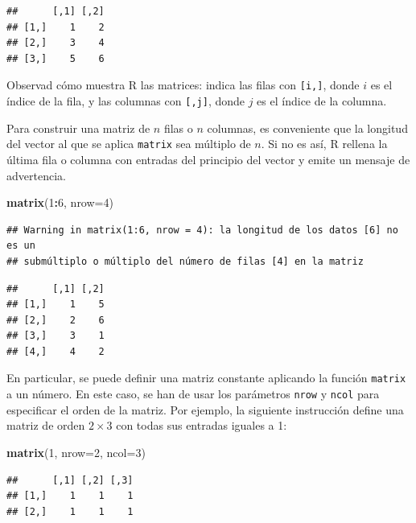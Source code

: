 \documentclass[]{book}
\newenvironment{Shaded}{\begin{snugshade}}{\end{snugshade}}
\newcommand{\DataTypeTok}[1]{\textcolor[rgb]{0.13,0.29,0.53}{#1}}
\newcommand{\DecValTok}[1]{\textcolor[rgb]{0.00,0.00,0.81}{#1}}
\newcommand{\KeywordTok}[1]{\textcolor[rgb]{0.13,0.29,0.53}{\textbf{#1}}}
\newcommand{\NormalTok}[1]{#1}
\newcommand{\OperatorTok}[1]{\textcolor[rgb]{0.81,0.36,0.00}{\textbf{#1}}}
\theoremstyle{definition}
\theoremstyle{definition}
\theoremstyle{definition}
\theoremstyle{remark}
\begin{document}
\begin{verbatim}
##      [,1] [,2]
## [1,]    1    2
## [2,]    3    4
## [3,]    5    6
\end{verbatim}

Observad cómo muestra R las matrices: indica las filas con \texttt{{[}i,{]}}, donde \(i\) es el índice de la fila, y las columnas con \texttt{{[},j{]}}, donde \(j\) es el índice de la columna.

Para construir una matriz de \(n\) filas o \(n\) columnas, es conveniente que la longitud del vector al que se aplica \texttt{matrix} sea múltiplo de \(n\). Si no es así, R rellena la última fila o columna con entradas del principio del vector y emite un mensaje de advertencia.

\begin{Shaded}
\begin{Highlighting}[]
\KeywordTok{matrix}\NormalTok{(}\DecValTok{1}\OperatorTok{:}\DecValTok{6}\NormalTok{, }\DataTypeTok{nrow=}\DecValTok{4}\NormalTok{)}
\end{Highlighting}
\end{Shaded}

\begin{verbatim}
## Warning in matrix(1:6, nrow = 4): la longitud de los datos [6] no es un
## submúltiplo o múltiplo del número de filas [4] en la matriz
\end{verbatim}

\begin{verbatim}
##      [,1] [,2]
## [1,]    1    5
## [2,]    2    6
## [3,]    3    1
## [4,]    4    2
\end{verbatim}

En particular, se puede definir una matriz constante aplicando la función \texttt{matrix} a un número. En este caso, se han de usar los parámetros \texttt{nrow} y \texttt{ncol} para especificar el orden de la matriz. Por ejemplo, la siguiente instrucción define una matriz de orden \(2\times 3\) con todas sus entradas iguales a 1:

\begin{Shaded}
\begin{Highlighting}[]
\KeywordTok{matrix}\NormalTok{(}\DecValTok{1}\NormalTok{, }\DataTypeTok{nrow=}\DecValTok{2}\NormalTok{, }\DataTypeTok{ncol=}\DecValTok{3}\NormalTok{) }
\end{Highlighting}
\end{Shaded}

\begin{verbatim}
##      [,1] [,2] [,3]
## [1,]    1    1    1
## [2,]    1    1    1
\end{verbatim}
\end{document}
